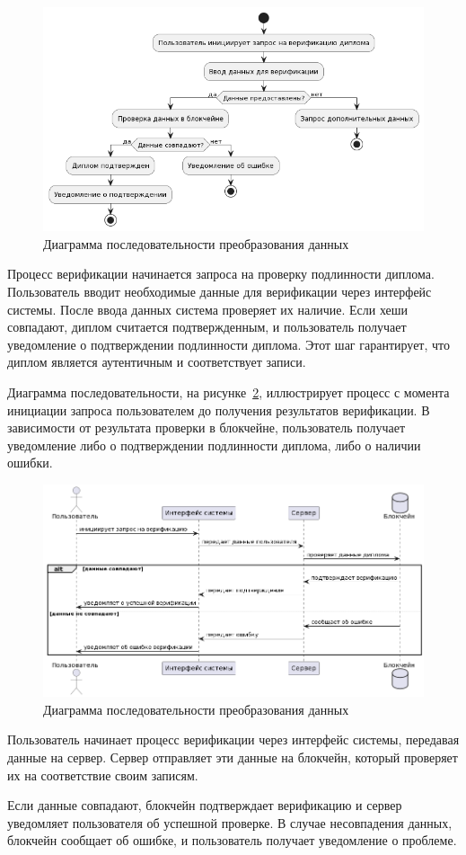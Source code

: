 \begin{figure}[H]
	\centering
	\includegraphics[width=.9\textwidth]{images/diploma_verif.png}
	\parskip=6pt
	\caption{Диаграмма последовательности преобразования данных}
	\label{fig:diploma_verif}
\end{figure}

Процесс верификации начинается запроса на проверку подлинности диплома. Пользователь вводит необходимые данные для верификации через интерфейс системы. После ввода данных система проверяет их наличие. Если хеши совпадают, диплом считается подтвержденным, и пользователь получает уведомление о подтверждении подлинности диплома. Этот шаг гарантирует, что диплом является аутентичным и соответствует записи.

Диаграмма последовательности, на рисунке~\ref{fig:diploma_verif_uscs}, иллюстрирует процесс с момента инициации запроса пользователем до получения результатов верификации. В зависимости от результата проверки в блокчейне, пользователь получает уведомление либо о подтверждении подлинности диплома, либо о наличии ошибки.

\begin{figure}[H]
	\centering
	\includegraphics[width=.9\textwidth]{images/diploma_verif_uscs.png}
	\parskip=6pt
	\caption{Диаграмма последовательности преобразования данных}
	\label{fig:diploma_verif_uscs}
\end{figure}

Пользователь начинает процесс верификации через интерфейс системы, передавая данные на сервер. Сервер отправляет эти данные на блокчейн, который проверяет их на соответствие своим записям.

Если данные совпадают, блокчейн подтверждает верификацию и сервер уведомляет пользователя об успешной проверке. В случае несовпадения данных, блокчейн сообщает об ошибке, и пользователь получает уведомление о проблеме.
